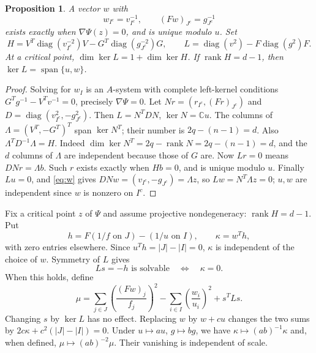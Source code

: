 \documentclass[11pt]{article}
\newtheorem{proposition}[theorem]{Proposition}
\theoremstyle{remark}\newtheorem{remark}[theorem]{Remark}
\DeclareMathOperator{\diag}{diag}
\DeclareMathOperator{\rank}{rank}
\newcommand{\C}{\mathbb C}\newcommand{\Q}{\mathbb Q}
\begin{document}
\begin{proposition}\label{prop:normal}
A vector $w$ with
\begin{equation}\label{eq:w}
 w_{I^c}=v_{I^c}^{-1},\qquad (Fw)_{J^c}=g_{J^c}^{-1}
\end{equation}
exists exactly when $\nabla\Psi(z)=0$, and is unique modulo $u$.
Set
\[
 H=V^T\diag(v_{I^c}^{-2})V-G^T\diag(g_{J^c}^{-2})G,\qquad
 L=\diag(v^2)-F\diag(g^2)F.
\]
At a critical point, $\dim\ker L=1+\dim\ker H$.
If $\rank H=d-1$, then $\ker L=\operatorname{span}\{u,w\}$.
\end{proposition}
\begin{proof}
Solving for $w_I$ is an $A$-system with complete left-kernel conditions
$G^Tg^{-1}-V^Tv^{-1}=0$, precisely $\nabla\Psi=0$.
Let $Nr=(r_{I^c},(Fr)_{J^c})$ and
$D=\diag(v_{I^c}^2,-g_{J^c}^2)$. Then $L=N^TDN$, $\ker N=\C u$.
The columns of $\Lambda=(V^T,-G^T)^T$ span $\ker N^T$; their number is
$2q-(n-1)=d$. Also $\Lambda^TD^{-1}\Lambda=H$.
Indeed $\dim\ker N^T=2q-\rank N=2q-(n-1)=d$, and the $d$ columns of
$\Lambda$ are independent because those of $G$ are.
Now $Lr=0$ means $DNr=\Lambda b$. Such $r$ exists exactly when $Hb=0$,
and is unique modulo $u$. Finally $Lu=0$, and \eqref{eq:w} gives
$DNw=(v_{I^c},-g_{J^c})=\Lambda z$, so $Lw=N^T\Lambda z=0$; $u,w$ are
independent since $w$ is nonzero on $I^c$.
\end{proof}

Fix a critical point $z$ of $\Psi$ and assume projective nondegeneracy:
$\rank H=d-1$. Put
\begin{equation}\label{eq:kappa}
 h=F(1/f\text{ on }J)-(1/u\text{ on }I),\qquad\kappa=w^Th,
\end{equation}
with zero entries elsewhere. Since $u^Th=|J|-|I|=0$, $\kappa$ is
independent of the choice of $w$. Symmetry of $L$ gives
\begin{equation}\label{eq:solvable}
 Ls=-h\text{ is solvable}\quad\Longleftrightarrow\quad\kappa=0.
\end{equation}
When this holds, define
\begin{equation}\label{eq:mu}
 \mu=\sum_{j\in J}\left(\frac{(Fw)_j}{f_j}\right)^2
       -\sum_{i\in I}\left(\frac{w_i}{u_i}\right)^2+s^TLs.
\end{equation}
Changing $s$ by $\ker L$ has no effect. Replacing $w$ by $w+cu$ changes
the two sums by $2c\kappa+c^2(|J|-|I|)=0$.
Under $u\mapsto au$, $g\mapsto bg$, we have
$\kappa\mapsto(ab)^{-1}\kappa$ and, when defined,
$\mu\mapsto(ab)^{-2}\mu$. Their vanishing is independent of scale.
\end{document}
